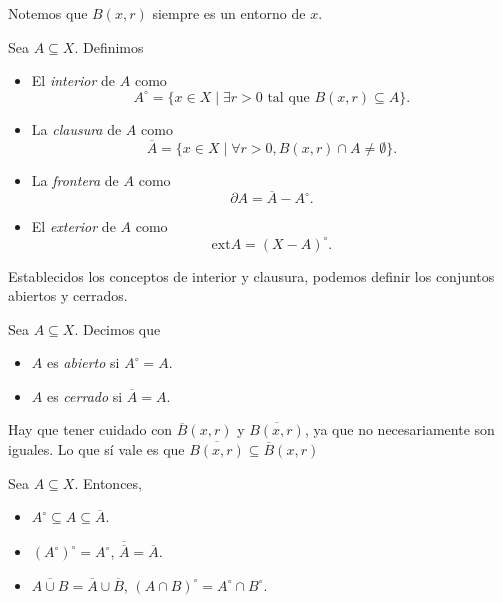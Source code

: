 \begin{center}
	
\end{center}

\begin{remark}
	Notemos que $B(x, r)$ siempre es un entorno de $x$.
\end{remark}

\begin{definition}
	Sea $A \subseteq X$. Definimos
	\begin{itemize}
		\item El \emph{interior} de $A$ como
		      $$
			      A^{\circ} = \{ x \in X \mid \exists r > 0 \text{ tal que } B(x, r) \subseteq A\}.
		      $$
		\item La \emph{clausura} de $A$ como
		      $$
			      \overline{A} = \{ x \in X \mid \forall r > 0, B(x, r) \cap A \neq \emptyset\}.
		      $$
		\item La \emph{frontera} de $A$ como
		      $$
			      \partial A = \overline{A} - A^{\circ}.
		      $$
		\item El \emph{exterior} de $A$ como
		      $$
			      \mathrm{ext} A = (X - A)^{\circ}.
		      $$
	\end{itemize}
\end{definition}

\begin{center}
	
\end{center}

Establecidos los conceptos de interior y clausura, podemos definir los conjuntos abiertos y cerrados.

\begin{definition}
	Sea $A \subseteq X$. Decimos que
	\begin{itemize}
		\item $A$ es \emph{abierto} si $A^{\circ} = A$.
		\item $A$ es \emph{cerrado} si $\overline{A} = A$.
	\end{itemize}
\end{definition}

\begin{remark}
	Hay que tener cuidado con $\overline{B}(x, r)$ y $\overline{B(x, r)}$, ya que no necesariamente son iguales. Lo que sí vale es que $\overline{B(x, r)} \subseteq \overline{B}(x, r)$
\end{remark}

\begin{proposition}
	Sea $A \subseteq X$. Entonces,
	\begin{itemize}
		\item $A^\circ \subseteq A \subseteq \overline{A}$.
		\item $(A^\circ)^\circ = A^\circ$, $\overline{\overline{A}} = \overline{A}$.
		\item $\overline{A \cup B} = \overline{A} \cup \overline{B}$, $(A \cap B)^\circ = A^\circ \cap B^\circ$.
	\end{itemize}
\end{proposition}

